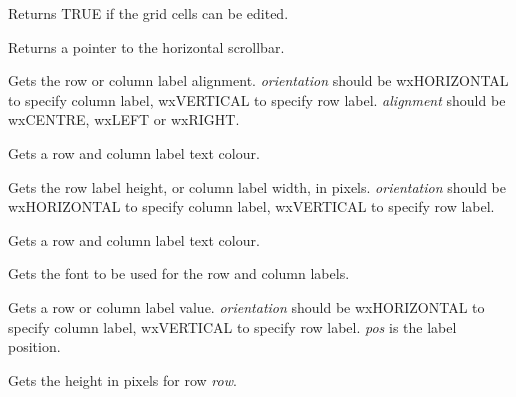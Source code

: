 Returns TRUE if the grid cells can be edited.



Returns a pointer to the horizontal scrollbar.



Gets the row or column label alignment. {\it orientation} should
be wxHORIZONTAL to specify column label, wxVERTICAL to specify row label.\rtfsp
{\it alignment} should be wxCENTRE, wxLEFT or wxRIGHT.



Gets a row and column label text colour.



Gets the row label height, or column label width, in pixels. {\it orientation} should
be wxHORIZONTAL to specify column label, wxVERTICAL to specify row label.



Gets a row and column label text colour.



Gets the font to be used for the row and column labels.



Gets a row or column label value. {\it orientation} should
be wxHORIZONTAL to specify column label, wxVERTICAL to specify row label.\rtfsp
{\it pos} is the label position.



Gets the height in pixels for row {\it row}.


